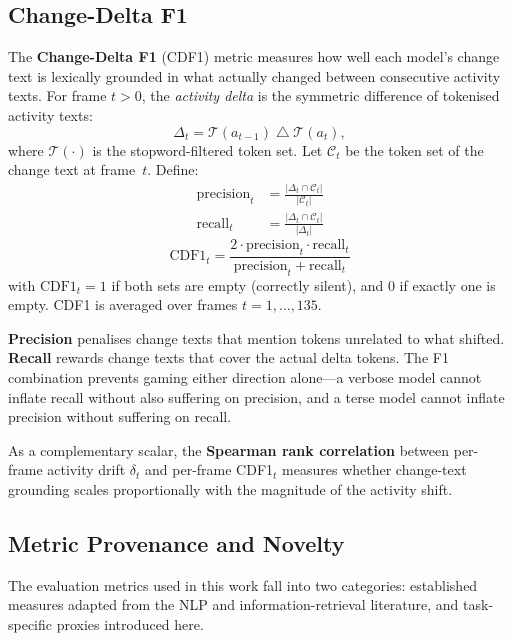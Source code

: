 \documentclass[10pt, twocolumn]{article}
\begin{document}
\subsection{Change-Delta F1}
\label{subsec:drift}

The \textbf{Change-Delta F1} (CDF1) metric measures how well each model's change text
is lexically grounded in what actually changed between consecutive activity texts. For
frame $t > 0$, the \emph{activity delta} is the symmetric difference of tokenised
activity texts:
\[
  \Delta_t = \mathcal{T}(a_{t-1}) \;\triangle\; \mathcal{T}(a_t),
\]
where $\mathcal{T}(\cdot)$ is the stopword-filtered token set. Let $\mathcal{C}_t$ be
the token set of the change text at frame~$t$. Define:
\begin{align*}
  \text{precision}_t &= \tfrac{|\Delta_t \cap \mathcal{C}_t|}{|\mathcal{C}_t|} \\[4pt]
  \text{recall}_t    &= \tfrac{|\Delta_t \cap \mathcal{C}_t|}{|\Delta_t|}
\end{align*}
\[
  \text{CDF1}_t = \frac{2 \cdot \text{precision}_t \cdot \text{recall}_t}
                       {\text{precision}_t + \text{recall}_t}
\]
with $\text{CDF1}_t = 1$ if both sets are empty (correctly silent), and $0$ if exactly
one is empty. CDF1 is averaged over frames $t = 1, \ldots, 135$.

\textbf{Precision} penalises change texts that mention tokens unrelated to what
shifted. \textbf{Recall} rewards change texts that cover the actual delta tokens.
The F1 combination prevents gaming either direction alone---a verbose model cannot
inflate recall without also suffering on precision, and a terse model cannot inflate
precision without suffering on recall.

As a complementary scalar, the \textbf{Spearman rank correlation} between per-frame
activity drift $\delta_t$ and per-frame CDF1$_t$ measures whether change-text grounding
scales proportionally with the magnitude of the activity shift.

\subsection{Metric Provenance and Novelty}
\label{subsec:provenance}

The evaluation metrics used in this work fall into two categories: established measures
adapted from the NLP and information-retrieval literature, and task-specific proxies
introduced here.
\end{document}
